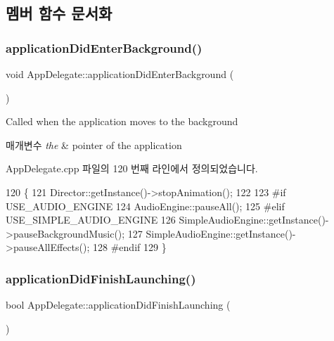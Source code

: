 \subsection{멤버 함수 문서화}
\mbox{\label{class_app_delegate_a17cb09777419781698324e0415bffd3a}} 
\subsubsection{\texorpdfstring{application\+Did\+Enter\+Background()}{applicationDidEnterBackground()}}
{\footnotesize\ttfamily void App\+Delegate\+::application\+Did\+Enter\+Background (\begin{DoxyParamCaption}{ }\end{DoxyParamCaption})\hspace{0.3cm}{\ttfamily [virtual]}}



Called when the application moves to the background 


\begin{DoxyParams}{매개변수}
{\em the} & pointer of the application \\
\hline
\end{DoxyParams}


App\+Delegate.\+cpp 파일의 120 번째 라인에서 정의되었습니다.


\begin{DoxyCode}
120                                                 \{
121     Director::getInstance()->stopAnimation();
122 
123 \textcolor{preprocessor}{#if USE\_AUDIO\_ENGINE}
124     AudioEngine::pauseAll();
125 \textcolor{preprocessor}{#elif USE\_SIMPLE\_AUDIO\_ENGINE}
126     SimpleAudioEngine::getInstance()->pauseBackgroundMusic();
127     SimpleAudioEngine::getInstance()->pauseAllEffects();
128 \textcolor{preprocessor}{#endif}
129 \}
\end{DoxyCode}
\mbox{\label{class_app_delegate_a68cbaed49edf7581dc59a09d5062fff3}} 
\subsubsection{\texorpdfstring{application\+Did\+Finish\+Launching()}{applicationDidFinishLaunching()}}
{\footnotesize\ttfamily bool App\+Delegate\+::application\+Did\+Finish\+Launching (\begin{DoxyParamCaption}{ }\end{DoxyParamCaption})\hspace{0.3cm}{\ttfamily [virtual]}}



